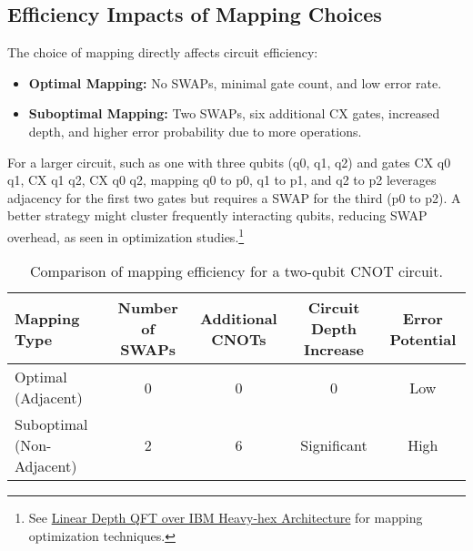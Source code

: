 \subsection*{Efficiency Impacts of Mapping Choices}

The choice of mapping directly affects circuit efficiency:

\begin{itemize}
  \item \textbf{Optimal Mapping:} No SWAPs, minimal gate count, and low error
    rate.
  \item \textbf{Suboptimal Mapping:} Two SWAPs, six additional CX gates,
    increased depth, and higher error probability due to more operations.
\end{itemize}

\vspace{0.3cm}

\noindent
For a larger circuit, such as one with three qubits (q0, q1, q2) and gates CX
q0 q1, CX q1 q2, CX q0 q2, mapping q0 to p0, q1 to p1, and q2 to p2 leverages
adjacency for the first two gates but requires a SWAP for the third (p0 to
p2). A better strategy might cluster frequently interacting qubits, reducing
SWAP overhead, as seen in optimization studies.\footnote{See
  \href{https://arxiv.org/html/2402.09705v1}{Linear Depth QFT over IBM
Heavy-hex Architecture} for mapping optimization techniques.}

\vspace{0.3cm}

\begin{center}
  \begin{table}[h]
    \centering
    \begin{tabular}{lcccc}
      \toprule
      Mapping Type & Number of SWAPs & Additional CNOTs & Circuit Depth Increase & Error Potential \\
      \midrule
      Optimal (Adjacent) & 0 & 0 & 0 & Low \\
      Suboptimal (Non-Adjacent) & 2 & 6 & Significant & High \\
      \bottomrule
    \end{tabular}
    \caption{Comparison of mapping efficiency for a two-qubit CNOT circuit.}
  \end{table}
\end{center}

